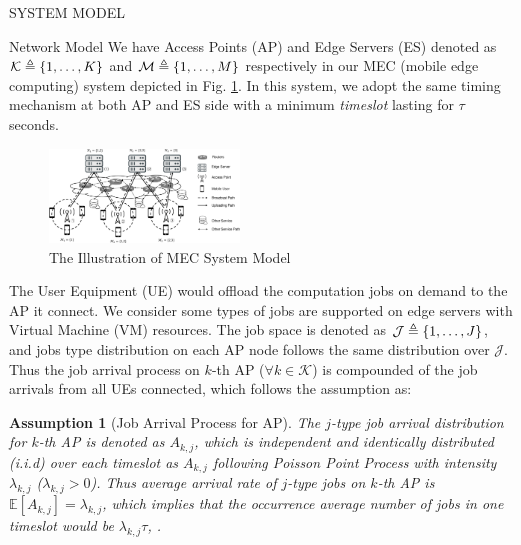 \documentclass[10pt, conference, letterpaper]{IEEEtran}
\newtheorem{assumption}{Assumption}
\newcommand{\define}{\triangleq}
\DeclarePairedDelimiter{\set}{\{}{\}}
\newcommand{\apSet}{\mathcal{K}}
\newcommand{\jSpace}{\mathcal{J}}
\begin{document}
    \begin{section}{SYSTEM MODEL}
        \label{sec:model}
        \begin{subsection}{Network Model}
            We have Access Points (AP) and Edge Servers (ES) denoted as $\apSet \define \set{1,\dots,K}$ and $\mathcal{M} \define \set{1,\dots,M}$ respectively in our MEC (mobile edge computing) system depicted in Fig. \ref{fig:system}. In this system, we adopt the same timing mechanism at both AP and ES side with a minimum \emph{timeslot} lasting for $\tau$ seconds.

            \begin{figure}[ht]
                \centering
                \includegraphics[width=0.45\textwidth, trim={0.5cm 0.5cm 0.5cm 0.5cm}, clip]{system-model.pdf}
                \caption{The Illustration of MEC System Model}
                \label{fig:system}
            \end{figure}

            The User Equipment (UE) would offload the computation jobs on demand to the AP it connect.
            We consider some types of jobs are supported on edge servers with Virtual Machine (VM) resources. The job space is denoted as $\jSpace \define \set{1,\dots, J}$, and jobs type distribution on each AP node follows the same distribution over $\jSpace$.
            Thus the job arrival process on $k$-th AP ($\forall k\in\apSet$) is compounded of the job arrivals from all UEs connected, which follows the assumption as:
            \begin{assumption}[Job Arrival Process for AP]
                The $j$-type job arrival distribution for $k$-th AP is denoted as $A_{k,j}$, which is independent and identically distributed (i.i.d) over each timeslot as $A_{k,j}$ following Poisson Point Process with intensity $\lambda_{k,j}$ ($\lambda_{k,j} > 0$). Thus average arrival rate of $j$-type jobs on $k$-th AP is $\mathbb{E}[A_{k,j}]=\lambda_{k,j}$, which implies that the occurrence average number of jobs in one timeslot would be $\lambda_{k,j}\tau$, .
            \end{assumption}


\end{subsection}
\end{section}
\end{document}
